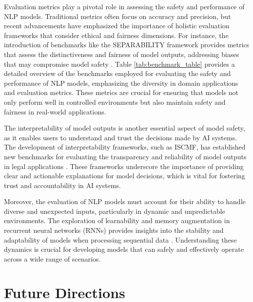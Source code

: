 Evaluation metrics play a pivotal role in assessing the safety and performance of NLP models. Traditional metrics often focus on accuracy and precision, but recent advancements have emphasized the importance of holistic evaluation frameworks that consider ethical and fairness dimensions. For instance, the introduction of benchmarks like the SEPARABILITY framework provides metrics that assess the distinctiveness and fairness of model outputs, addressing biases that may compromise model safety \cite{chiaburu2024copronnconceptbasedprototypicalnearest}. Table \ref{tab:benchmark_table} provides a detailed overview of the benchmarks employed for evaluating the safety and performance of NLP models, emphasizing the diversity in domain applications and evaluation metrics. These metrics are crucial for ensuring that models not only perform well in controlled environments but also maintain safety and fairness in real-world applications.

The interpretability of model outputs is another essential aspect of model safety, as it enables users to understand and trust the decisions made by AI systems. The development of interpretability frameworks, such as ISCMF, has established new benchmarks for evaluating the transparency and reliability of model outputs in legal applications \cite{lin2023interpretabilityframeworksimilarcase}. These frameworks underscore the importance of providing clear and actionable explanations for model decisions, which is vital for fostering trust and accountability in AI systems.

Moreover, the evaluation of NLP models must account for their ability to handle diverse and unexpected inputs, particularly in dynamic and unpredictable environments. The exploration of learnability and memory augmentation in recurrent neural networks (RNNs) provides insights into the stability and adaptability of models when processing sequential data \cite{das2024exploringlearnabilitymemoryaugmentedrecurrent}. Understanding these dynamics is crucial for developing models that can safely and effectively operate across a wide range of scenarios.
















\section{Future Directions} \label{sec:Future Directions}

